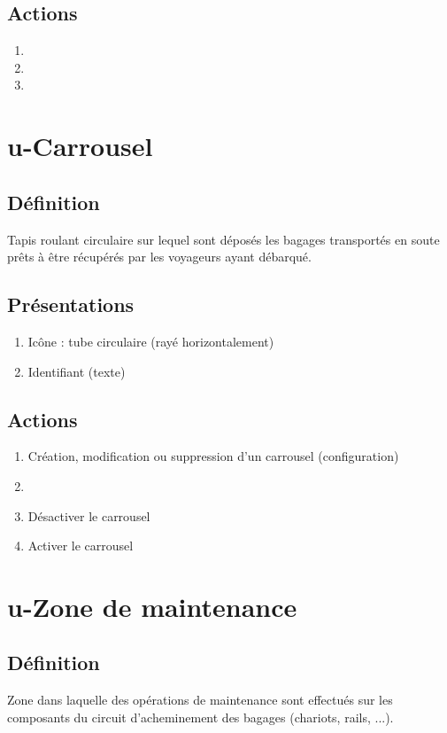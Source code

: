\subsection{Actions}
\begin{enumerate}
	\item {}
	\item {}
	\item \transit
\end{enumerate}

\section{u-Carrousel}
\subsection{Définition}
	Tapis roulant circulaire sur lequel sont déposés les bagages transportés en soute prêts à être récupérés par les voyageurs
	ayant débarqué.

\subsection{Présentations}
\begin{enumerate}
	\item Icône : tube circulaire (rayé horizontalement)
	\item Identifiant (texte)
\end{enumerate}

\subsection{Actions}
\begin{enumerate}
	\item Création, modification ou suppression d'un carrousel (configuration)
	\item \etat
	\item Désactiver le carrousel
	\item Activer le carrousel
\end{enumerate}

\section{u-Zone de maintenance}
\subsection{Définition}
	Zone dans laquelle des opérations de maintenance sont effectués sur les composants du circuit d'acheminement des bagages
	(chariots, rails, ...).

